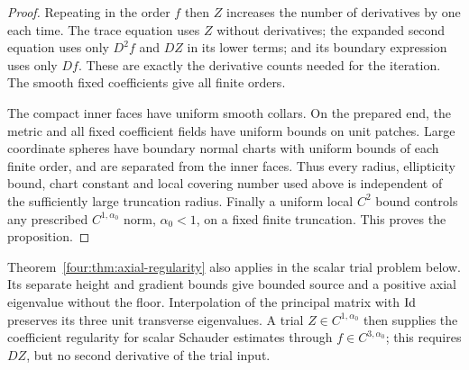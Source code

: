 \begin{proof}
Repeating in the order $f$ then $Z$ increases the number of
derivatives by one each time.  The trace equation uses $Z$ without
derivatives; the expanded second equation uses only $D^2f$ and
$DZ$ in its lower terms; and its boundary expression uses only
$Df$.  These are exactly the derivative counts needed for the
iteration.  The smooth fixed coefficients give all finite orders.

The compact inner faces have uniform smooth collars.  On the
prepared end, the metric and all fixed coefficient fields have
uniform bounds on unit patches.  Large coordinate spheres have
boundary normal charts with uniform bounds of each finite order,
and are separated from the inner faces.  Thus every radius,
ellipticity bound, chart constant and local covering number used
above is independent of the sufficiently large truncation radius.
Finally a uniform local $C^2$ bound controls any prescribed
$C^{1,\alpha_0}$ norm, $\alpha_0<1$, on a fixed finite truncation.
This proves the proposition.
\end{proof}

\begin{remark}\label{four:reg:scalar-trial-interface}
Theorem~\ref{four:thm:axial-regularity} also applies in the scalar trial
problem below. Its separate height and gradient bounds give bounded
source and a positive axial eigenvalue without the floor. Interpolation
of the principal matrix with $\operatorname{Id}$ preserves its three unit transverse
eigenvalues. A trial $Z\in C^{1,\alpha_0}$ then supplies the coefficient
regularity for scalar Schauder estimates through $f\in C^{3,\alpha_0}$;
this requires $DZ$, but no second derivative of the trial input.
\end{remark}
